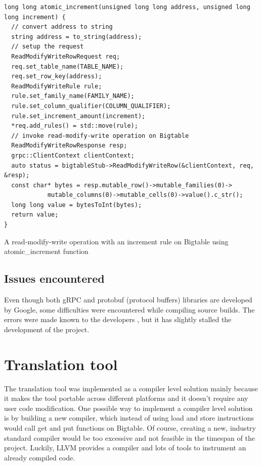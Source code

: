 \documentclass[bsc,frontabs,twoside,singlespacing,parskip,deptreport]{infthesis}     %
\begin{document}
\begin{listing}[H]
\begin{verbatim}
long long atomic_increment(unsigned long long address, unsigned long long increment) {
  // convert address to string
  string address = to_string(address);
  // setup the request
  ReadModifyWriteRowRequest req;
  req.set_table_name(TABLE_NAME);
  req.set_row_key(address);
  ReadModifyWriteRule rule;
  rule.set_family_name(FAMILY_NAME);
  rule.set_column_qualifier(COLUMN_QUALIFIER);
  rule.set_increment_amount(increment);
  *req.add_rules() = std::move(rule);
  // invoke read-modify-write operation on Bigtable
  ReadModifyWriteRowResponse resp;
  grpc::ClientContext clientContext;
  auto status = bigtableStub->ReadModifyWriteRow(&clientContext, req, &resp);
  const char* bytes = resp.mutable_row()->mutable_families(0)->
  			mutable_columns(0)->mutable_cells(0)->value().c_str();
  long long value = bytesToInt(bytes);
  return value;
}
\end{verbatim}
\caption{A read-modify-write operation with an increment rule on Bigtable using atomic\_increment function}
\label{get}
\end{listing}

\section{Issues encountered}

Even though both gRPC and protobuf (protocol buffers) libraries are developed by Google, some difficulties were encountered while compiling source builds. The errors were made known to the developers \citep{grpc_issue}, but it has slightly stalled the development of the project.









\chapter{Translation tool}
\label{translation-tool}

The translation tool was implemented as a compiler level solution mainly because it makes the tool portable across different platforms and it doesn't require any user code modification. One possible way to implement a compiler level solution is by building a new compiler, which instead of using load and store instructions would call get and put functions on Bigtable. Of course, creating a new, industry standard compiler would be too excessive and not feasible in the timespan of the project. Luckily, LLVM provides a compiler and lots of tools to instrument an already compiled code.
\end{document}
